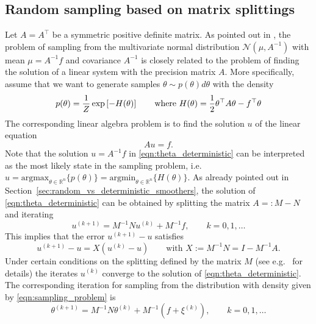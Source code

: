 \documentclass[11pt,english]{article}
\theoremstyle{plain}
\theoremstyle{plain}
\theoremstyle{plain}
\theoremstyle{plain}
\numberwithin{equation}{section}
\newcommand*{\id}{I}
\newcommand{\rev}[1]{#1}
\begin{document}
\subsection{Random \rev{sampling based on matrix splittings}\label{subsec:matrix-splitting}}
Let $A=A^\top$ be a symmetric positive definite matrix. As pointed out in \cite{Fox.C_Parker_2017_AcceleratedGibbsSampling}, the problem of sampling from the multivariate normal distribution $\mathcal{N}(\mu,A^{-1})$ with mean $\mu=A^{-1}f$ and covariance $A^{-1}$ is closely related to the problem of finding the solution of a linear system with the precision matrix $A$. More specifically, assume that we want to generate samples $\theta\sim p(\theta)d\theta$ with the density
\begin{equation}
	p(\theta)=\frac{1}{Z}\exp\left[-H(\theta)\right]\qquad\text{where \ensuremath{H(\theta)=\frac{1}{2}\theta^{\top}A\theta-f^{\top}\theta}}\label{eqn:sampling_problem}
\end{equation}
The corresponding linear algebra problem is to find the solution $u$ of the linear equation
\begin{equation}
	Au=f.\label{eqn:theta_deterministic}
\end{equation}
Note that the solution $u=A^{-1}f$ in \eqref{eqn:theta_deterministic} can be interpreted as the most likely state in the sampling problem, i.e. $u=\text{argmax}_{\theta\in\mathbb{R}^{n}}\{p(\theta)\}=\text{argmin}_{\theta\in\mathbb{R}^{n}}\{H(\theta)\}$. As already pointed out in Section~\ref{sec:random_vs_deterministic_smoothers}, the solution of \eqref{eqn:theta_deterministic} can be obtained by splitting the matrix $A=:M-N$  and iterating
\begin{equation}
	u^{(k+1)}=M^{-1}Nu^{(k)}+M^{-1}f,\qquad k=0,1,\dots\label{eqn:splitting_iteration}
\end{equation}
This implies that the error $u^{(k+1)}-u$ satisfies
\begin{equation}
	u^{(k+1)}-u = X (u^{(k)}-u)\qquad\text{with $X:= M^{-1}N = \id - M^{-1}A$.}\label{eqn:deterministic_error_iteration}
\end{equation}
Under certain conditions on the splitting defined by the matrix $M$ (see e.g.\ \cite{saad2003iterative} for details) the iterates $u^{(k)}$ converge to the solution of \eqref{eqn:theta_deterministic}. The corresponding iteration for sampling from the distribution with density given by \eqref {eqn:sampling_problem} is
\begin{equation}
	\theta^{(k+1)}=M^{-1}N\theta^{(k)}+M^{-1}(f+\xi^{(k)}),\qquad k=0,1,\dots\label{eqn:theta_random}
\end{equation}
\end{document}

